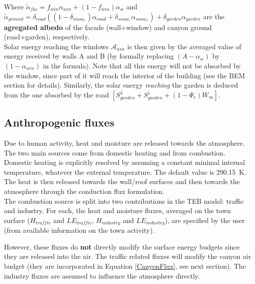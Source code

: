 Where $\tilde{\alpha}_{fac} = f_{win}\alpha_{win} + (1-f_{win})\alpha_w$ and $\tilde{\alpha}_{ground} = \delta_{road}\left((1-\delta_{snow_r})\alpha_{road} + \delta_{snow_r}\alpha_{snow_r}\right) + \delta_{garden}\alpha_{garden}$ are the {\bf agregated albedo} of the facade (wall+window) and canyon ground (road+garden), respectively. \\

Solar energy reaching the windows $\mathcal{A}_{win}$ is then given by the averaged value of energy received by walls A and B (by formally replacing $(A-\alpha_w)$ by $(1-\alpha_{win})$ in the formula). Note that all this energy will not be absorbed by the window, since part of it will reach the interior of the building (see the BEM section for details). Similarly, the solar energy {\it reaching} the garden is deduced from the one absorbed by the road $\left[S^\Downarrow_{garden}+S^\downarrow_{garden}  + (1-\Psi_r)W_\infty\right]$. \\


\subsection{Anthropogenic fluxes}

Due to human activity, heat and moisture are released towards the atmosphere.
The two main sources come from domestic heating and from combustion.\\

Domestic heating is explicitly resolved by assuming a constant
minimal internal temperature, whatever the external temperature.
The default value is 290.15~K. The heat is then released towards
the wall/roof surfaces and then towards the atmosphere through the
conduction flux formulation.\\

The combustion source is split into two contributions in the TEB model:
traffic and industry.
For each, the heat and moisture fluxes, averaged on the town surface
($H_{traffic}$ and $LE_{traffic}$, $H_{industry}$ and $LE_{industry}$),
are specified by the user (from available information on
the town activity).

However, these fluxes do {\bf not} directly modify the surface energy budgets
since they are released into the air.
The traffic related fluxes will modify the canyon air budget
(they are incorporated in Equation \ref{CanyonFlux}, see next section).
The industry fluxes are assumed to 
influence the atmosphere directly.\\

